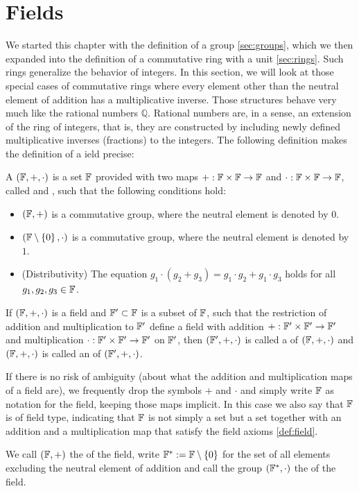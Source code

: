 \section{Fields}\label{sec:fields}
We started this chapter with the definition of a group \ref{sec:groups}, which we then expanded into the definition of a commutative ring with a unit \ref{sec:rings}. Such rings generalize the behavior of integers. In this section, we will look at those special cases of commutative rings where every element other than the neutral element of addition has a multiplicative inverse. Those structures behave very much like the rational numbers $\mathbb{Q}$. Rational numbers are, in a sense, an extension of the ring of integers, that is, they are constructed by including newly defined multiplicative inverses (fractions) to the integers. The following definition makes the definition of a ield precise:
\begin{definition}[Field]\label{def:field}
A  $ (\mathbb{F}, +, \cdot) $ is a set $\mathbb{F}$ provided with two maps $ +: \mathbb{F} \times \mathbb{F} \to \mathbb{F} $ and $ \cdot: \mathbb{F} \times \mathbb{F} \to \mathbb{F} $, called  and , such that the following conditions hold:
\begin{itemize}
\item $ \left (\mathbb{F}, + \right) $ is a commutative group, where the neutral element is denoted by $ 0 $.
\item $ \left (\mathbb{F} \setminus \left \{0 \right \}, \cdot \right) $ is a commutative group, where the neutral element is denoted by $ 1 $.
\item (Distributivity) The equation $g_1 \cdot \left (g_2 + g_3 \right) = g_1 \cdot g_2 + g_1 \cdot g_3$  holds for all $ g_1, g_2, g_3 \in \mathbb{F} $.
\end{itemize}
If $(\mathbb{F},+,\cdot)$ is a field and $\mathbb{F}'\subset \mathbb{F}$ is a subset of $\mathbb{F}$, such that the restriction of addition and multiplication to $\mathbb{F}'$ define a field with addition $+: \mathbb{F}'\times \mathbb{F}' \to \mathbb{F}'$ and multiplication $\cdot: \mathbb{F}'\times \mathbb{F}' \to \mathbb{F}'$ on $\mathbb{F}'$, then $(\mathbb{F}',+,\cdot)$ is called a  of $(\mathbb{F},+,\cdot)$ and $(\mathbb{F},+,\cdot)$ is called an  of $(\mathbb{F}',+,\cdot)$.
\end{definition}

\begin{notation} If there is no risk of ambiguity (about what the addition and multiplication maps  of a field are), we frequently drop the symbols $+$ and $\cdot$ and simply write $\mathbb{F}$ as notation for the field, keeping those maps implicit. In this case we also say that $\mathbb{F}$ is of field type, indicating that $\mathbb{F}$ is not simply a set but a set together with an addition and a multiplication map that satisfy the field axioms \ref {def:field}.

We call $(\mathbb{F},+)$ the  of the field, write $\mathbb{F}^*:= \mathbb{F} \setminus \left \{0 \right \}$ for the set of all elements excluding the neutral element of addition and call the group $(\mathbb{F}^*,\cdot)$ the  of the field.
\end{notation}

